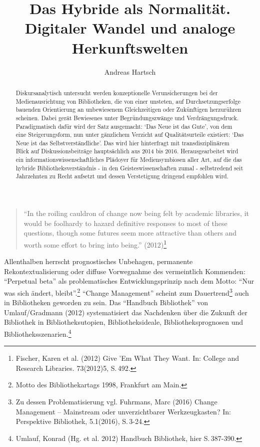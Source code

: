 \documentclass[a4paper,
fontsize=11pt,
oneside,
numbers=noperiodatend,
parskip=half-,
bibliography=totoc,
final
]{scrartcl}
\title{\LARGE{Das Hybride als Normalität. Digitaler Wandel und analoge Herkunftswelten}} %
\author{Andreas Hartsch} %
\date{}
\begin{document}
\maketitle
\thispagestyle{fancyplain} 

\begin{abstract}
Diskursanalytisch untersucht werden konzeptionelle Verunsicherungen bei
der Medienausrichtung von Bibliotheken, die von einer unsteten, auf
Durchsetzungserfolge bauenden Orientierung an unbewiesenem
Gleichzeitigen oder Zukünftigen herzurühren scheinen. Dabei gerät
Bewiesenes unter Begründungszwänge und Verdrängungsdruck. Paradigmatisch
dafür wird der Satz ausgemacht: `Das Neue ist das Gute', von dem eine
Steigerungsform, nun unter gänzlichem Verzicht auf Qualitätsurteile
existiert: `Das Neue ist das Selbstverständliche'. Das wird hier
hinterfragt mit transdisziplinärem Blick auf Diskussionsbeiträge
hauptsächlich aus 2014 bis 2016. Herausgearbeitet wird ein
informationswissenschaftliches Plädoyer für Mediensymbiosen aller Art,
auf die das hybride Bibliotheksverständnis - in den
Geisteswissenschaften zumal - selbstredend seit Jahrzehnten zu Recht
aufsetzt und dessen Verstetigung dringend empfohlen wird.
\end{abstract}

\begin{quote}
\enquote{In the roiling cauldron of change now being felt by academic
libraries, it would be foolhardy to hazard definitive responses to most
of these questions, though some futures seem more attractive than others
and worth some effort to bring into being.} (2012)\footnote{Fischer,
  Karen et al. (2012) Give 'Em What They Want. In: College and Research
  Libraries. 73(2012)5, S.\,492.}
\end{quote}

Allenthalben herrscht prognostisches Unbehagen, permanente
Rekontextualisierung oder diffuse Vorwegnahme des vermeintlich
Kommenden: \enquote{Perpetual beta} als problematisches
Entwicklungsprinzip nach dem Motto: \enquote{Nur was sich ändert,
bleibt}.\footnote{Motto des Bibliothekartags 1998, Frankfurt am Main.}
\enquote{Change Management} scheint zum Dauertrend\footnote{Zu dessen
  Problematisierung vgl. Fuhrmans, Marc (2016) Change Management --
  Mainstream oder unverzichtbarer Werkzeugkasten? In: Perspektive
  Bibliothek, 5.1(2016), S.\,3-24.} auch in Bibliotheken geworden zu
sein. Das \enquote{Handbuch Bibliothek} von Umlauf/Gradmann (2012)
systematisiert das Nachdenken über die Zukunft der Bibliothek in
Bibliotheksutopien, Bibliotheksideale, Bibliotheksprognosen und
Bibliotheksszenarien.\footnote{Umlauf, Konrad (Hg. et al. 2012) Handbuch
  Bibliothek, hier S.\,387-390.}
\end{document}
